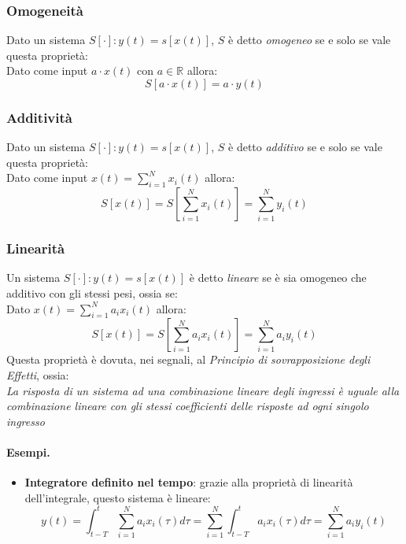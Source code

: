 \subsubsection{Omogeneità}
Dato un sistema $S[\cdot] : y(t) = s[x(t)]$, $S$ è detto \textit{omogeneo} se e solo se vale questa proprietà:\\
Dato come input $a\cdot x(t)$ con $a \in \mathbb{R}$ allora:
\begin{equation}
    S[a\cdot x(t)] = a\cdot y(t)
\end{equation}

\subsubsection{Additività}
Dato un sistema $S[\cdot] : y(t) = s\left[x(t)\right]$, $S$ è detto \textit{additivo} se e solo se vale questa proprietà:\\
Dato come input $x(t) = \sum_{i = 1}^{N} x_i(t)$ allora:
\begin{equation}
    S[x(t)] = S\left[\sum_{i = 1}^{N} x_i(t)\right] = \sum_{i = 1}^{N} y_i(t)
\end{equation}

\subsubsection{Linearità} \label{prop: linearita}
Un sistema $S[\cdot] : y(t) = s\left[x(t)\right]$ è detto \textit{lineare} se è sia omogeneo che additivo con gli stessi pesi, ossia se:\\
Dato $x(t) = \sum_{i = 1}^{N} a_i x_i(t)$ allora:
\begin{equation}
    S[x(t)] = S\left[\sum_{i = 1}^{N} a_i x_i(t)\right] = \sum_{i = 1}^{N} a_i y_i(t)
\end{equation}
Questa proprietà è dovuta, nei segnali, al \textit{Principio di sovrapposizione degli Effetti}, ossia:\\
\textit{La risposta di un sistema ad una combinazione lineare degli ingressi è uguale alla combinazione lineare con gli stessi
coefficienti delle risposte ad ogni singolo ingresso}

\paragraph{Esempi.}
\begin{itemize}
    \item \textbf{Integratore definito nel tempo}: grazie alla proprietà di linearità dell'integrale, questo sistema è lineare:
    \begin{equation}
        y(t) = \int_{t -T}^{t} \sum_{i = 1}^{N} a_i x_i(\tau) d\tau = \sum_{i = 1}^{N}  \int_{t -T}^{t}  a_i x_i(\tau) d\tau = \sum_{i = 1}^{N} a_i y_i(t)
    \end{equation}
\end{itemize}


